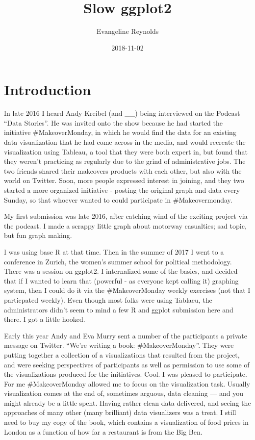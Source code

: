 \documentclass[]{book}
\title{Slow ggplot2}
\author{Evangeline Reynolds}
\date{2018-11-02}
\theoremstyle{definition}
\theoremstyle{definition}
\theoremstyle{definition}
\theoremstyle{remark}
\begin{document}
\maketitle

{
\setcounter{tocdepth}{1}
\tableofcontents
}
\chapter{Introduction}\label{intro}

In late 2016 I heard Andy Kreibel (and \_\_) being interviewed on the
Podcast ``Data Stories''. He was invited onto the show because he had
started the initiative \#MakeoverMonday, in which he would find the data
for an existing data visualization that he had come across in the media,
and would recreate the visualization using Tableau, a tool that they
were both expert in, but found that they weren't practicing as regularly
due to the grind of administrative jobs. The two friends shared their
makeovers products with each other, but also with the world on Twitter.
Soon, more people expressed interest in joining, and they two started a
more organized initiative - posting the original graph and data every
Sunday, so that whoever wanted to could participate in \#Makeovermonday.

My first submission was late 2016, after catching wind of the exciting
project via the podcast. I made a scrappy little graph about motorway
casualties; sad topic, but fun graph making.

I was using base R at that time. Then in the summer of 2017 I went to a
conference in Zurich, the women's summer school for political
methodology. There was a session on ggplot2. I internalized some of the
basics, and decided that if I wanted to learn that (powerful - as
everyone kept calling it) graphing system, then I could do it via the
\#MakeoverMonday weekly exercises (not that I particpated weekly). Even
though most folks were using Tablaeu, the administrators didn't seem to
mind a few R and ggplot submission here and there. I got a little
hooked.

Early this year Andy and Eva Murry sent a number of the participants a
private message on Twitter. ``We're writing a book: \#MakeoverMonday''.
They were putting together a collection of a visualizations that
resulted from the project, and were seeking perspectives of participants
as well as permission to use some of the visualizations produced for the
initiatives. Cool. I was pleased to participate. For me \#MakeoverMonday
allowed me to focus on the visualization task. Usually visualization
comes at the end of, sometimes arguous, data cleaning --- and you might
already be a little spent. Having rather clean data delivered, and
seeing the approaches of many other (many brilliant) data visualizers
was a treat. I still need to buy my copy of the book, which contains a
visualization of food prices in London as a function of how far a
restaurant is from the Big Ben.
\end{document}
